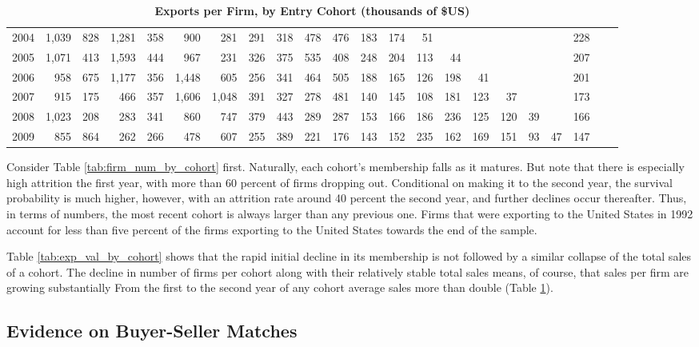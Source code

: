\documentclass[12pt,titlepage]{article}
\begin{document}
\begin{table}
{\begin{tabular}{l|rrrrrrrrrrrrrrrrrrrr|r}
2004 & 1,039 & 828  & 1,281 & 358  & 900   & 281   & 291  & 318  & 478  & 476  & 183  & 174  & 51   &      &      &      &      &      & 228 \\
2005 & 1,071 & 413  & 1,593 & 444  & 967   & 231   & 326  & 375  & 535  & 408  & 248  & 204  & 113  & 44   &      &      &      &      & 207 \\
2006 & 958   & 675  & 1,177 & 356  & 1,448 & 605   & 256  & 341  & 464  & 505  & 188  & 165  & 126  & 198  & 41   &      &      &      & 201 \\
2007 & 915   & 175  & 466   & 357  & 1,606 & 1,048 & 391  & 327  & 278  & 481  & 140  & 145  & 108  & 181  & 123  & 37   &      &      & 173 \\
2008 & 1,023 & 208  & 283   & 341  & 860   & 747   & 379  & 443  & 289  & 287  & 153  & 166  & 186  & 236  & 125  & 120  & 39   &      & 166 \\
2009 & 855   & 864  & 262   & 266  & 478   & 607   & 255  & 389  & 221  & 176  & 143  & 152  & 235  & 162  & 169  & 151  & 93   & 47   & 147 \\ \hline
    \end{tabular}
    }
    \caption{\textbf{Exports per Firm, by Entry Cohort (thousands of \$US)}}
    \label{tab:exp_per_firm_by_cohort}\centering
\end{table}

Consider Table \ref{tab:firm_num_by_cohort} first. Naturally, each cohort's
membership falls as it matures. But note that there is especially high
attrition the first year, with more than 60 percent of firms dropping out.
Conditional on making it to the second year, the survival probability is
much higher, however, with an attrition rate around 40 percent the second
year, and further declines occur thereafter. Thus, in terms of
numbers, the most recent cohort is always larger than any previous one.
Firms that were exporting to the United States in 1992 account for less than
five percent of the firms exporting to the United States towards the end of
the sample.

Table \ref{tab:exp_val_by_cohort} shows that the rapid initial decline in
its membership is not followed by a similar collapse of the total sales of a
cohort. The decline in number of firms per cohort along with their
relatively stable total sales means, of course, that sales per firm are
growing substantially From the first to the second year of any cohort
average sales more than double (Table \ref{tab:exp_per_firm_by_cohort}).

\subsection{Evidence on Buyer-Seller Matches}
\end{document}
